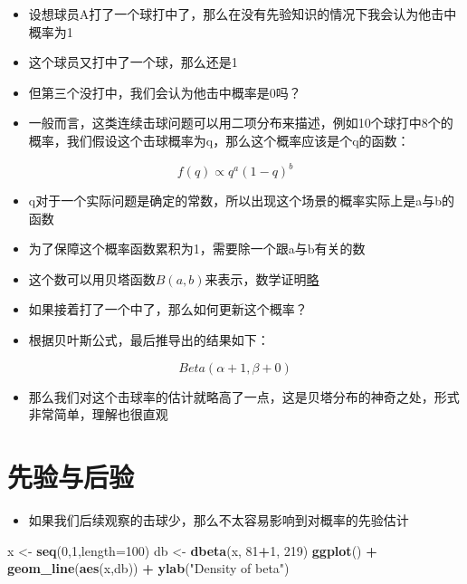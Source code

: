 \documentclass[
]{book}
\newenvironment{Shaded}{\begin{snugshade}}{\end{snugshade}}
\newcommand{\DataTypeTok}[1]{\textcolor[rgb]{0.13,0.29,0.53}{#1}}
\newcommand{\DecValTok}[1]{\textcolor[rgb]{0.00,0.00,0.81}{#1}}
\newcommand{\KeywordTok}[1]{\textcolor[rgb]{0.13,0.29,0.53}{\textbf{#1}}}
\newcommand{\NormalTok}[1]{#1}
\newcommand{\OperatorTok}[1]{\textcolor[rgb]{0.81,0.36,0.00}{\textbf{#1}}}
\newcommand{\StringTok}[1]{\textcolor[rgb]{0.31,0.60,0.02}{#1}}
\providecommand{\tightlist}{%
  \setlength{\itemsep}{0pt}\setlength{\parskip}{0pt}}
\begin{document}
\begin{itemize}
\tightlist
\item
  设想球员A打了一个球打中了，那么在没有先验知识的情况下我会认为他击中概率为1
\item
  这个球员又打中了一个球，那么还是1
\item
  但第三个没打中，我们会认为他击中概率是0吗？
\item
  一般而言，这类连续击球问题可以用二项分布来描述，例如10个球打中8个的概率，我们假设这个击球概率为q，那么这个概率应该是个q的函数：
\end{itemize}

\[f(q) \propto q^a(1-q)^b\]

\begin{itemize}
\tightlist
\item
  q对于一个实际问题是确定的常数，所以出现这个场景的概率实际上是a与b的函数
\item
  为了保障这个概率函数累积为1，需要除一个跟a与b有关的数
\item
  这个数可以用贝塔函数\(B(a,b)\)来表示，数学证明\href{https://en.wikipedia.org/wiki/Conjugate_prior\#Example}{略}
\item
  如果接着打了一个中了，那么如何更新这个概率？
\item
  根据贝叶斯公式，最后推导出的结果如下：
\end{itemize}

\[Beta(\alpha+1,\beta+0)\]

\begin{itemize}
\tightlist
\item
  那么我们对这个击球率的估计就略高了一点，这是贝塔分布的神奇之处，形式非常简单，理解也很直观
\end{itemize}

\hypertarget{ux5148ux9a8cux4e0eux540eux9a8c}{%
\section{先验与后验}\label{ux5148ux9a8cux4e0eux540eux9a8c}}

\begin{itemize}
\tightlist
\item
  如果我们后续观察的击球少，那么不太容易影响到对概率的先验估计
\end{itemize}

\begin{Shaded}
\begin{Highlighting}[]
\NormalTok{x <-}\StringTok{ }\KeywordTok{seq}\NormalTok{(}\DecValTok{0}\NormalTok{,}\DecValTok{1}\NormalTok{,}\DataTypeTok{length=}\DecValTok{100}\NormalTok{)}
\NormalTok{db <-}\StringTok{ }\KeywordTok{dbeta}\NormalTok{(x, }\DecValTok{81}\OperatorTok{+}\DecValTok{1}\NormalTok{, }\DecValTok{219}\NormalTok{)}
\KeywordTok{ggplot}\NormalTok{() }\OperatorTok{+}\StringTok{ }\KeywordTok{geom_line}\NormalTok{(}\KeywordTok{aes}\NormalTok{(x,db)) }\OperatorTok{+}\StringTok{ }\KeywordTok{ylab}\NormalTok{(}\StringTok{"Density of beta"}\NormalTok{)}
\end{Highlighting}
\end{Shaded}
\end{document}
